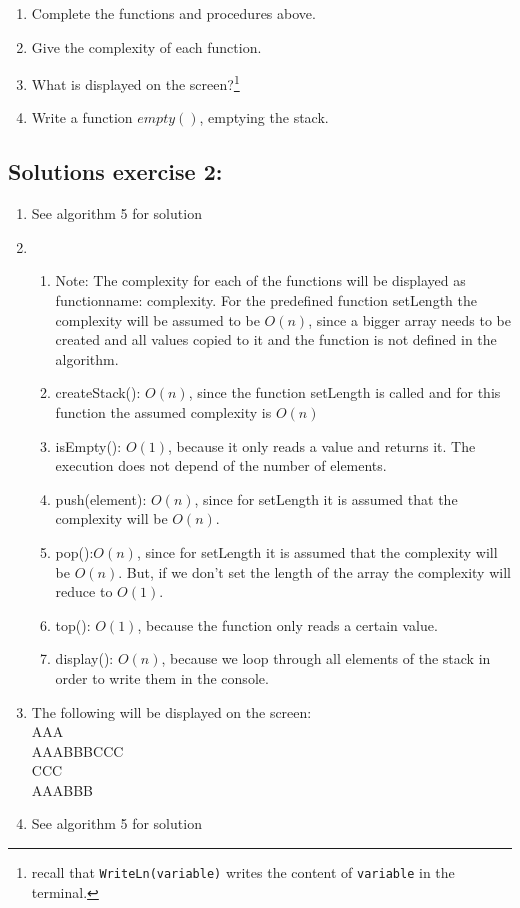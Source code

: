 \documentclass{article}
\begin{document}
\begin{enumerate}
\item Complete the functions and procedures above.
\item Give the complexity of each function.
\item What is displayed on the screen?\footnote{recall that \texttt{WriteLn(variable)} writes the content of \texttt{variable} in the terminal.}
\item Write a function $empty()$, emptying the stack.
\end{enumerate}

\subsection*{Solutions exercise 2:}
\begin{enumerate}
    \item See algorithm 5 for solution
    \item
        \begin{enumerate}[label=(\alph*)]
            \item Note: The complexity for each of the functions will be displayed as functionname: complexity. For the predefined function setLength the complexity will be assumed to be $O(n)$, since a bigger array needs to be created and all values copied to it and the function is not defined in the algorithm.
            \item createStack(): $O(n)$, since the function setLength is called and for this function the assumed complexity is $O(n)$
            \item isEmpty(): $O(1)$, because it only reads a value and returns it. The execution does not depend of the number of elements.
            \item push(element): $O(n)$, since for setLength it is assumed that the complexity will be $O(n)$.
            \item pop():$O(n)$, since for setLength it is assumed that the complexity will be $O(n)$. But, if we don't set the length of the array the complexity will reduce to $O(1)$.
            \item top(): $O(1)$, because the function only reads a certain value.
            \item display(): $O(n)$, because we loop through all elements of the stack in order to write them in the console.
        \end{enumerate}
    \item The following will be displayed on the screen: \\
    AAA \\
    AAABBBCCC \\
    CCC \\
    AAABBB
    \item See algorithm 5 for solution
\end{enumerate}
\end{document}
